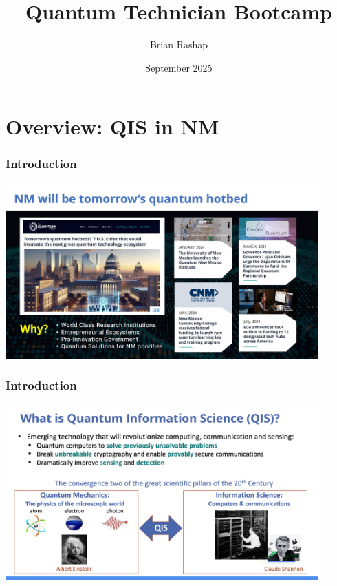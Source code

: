 \documentclass{beamer}
\begin{document}
\title{Quantum Technician Bootcamp}
\author{Brian Rashap}
\date{September 2025} 

\begin{frame}
\titlepage
\end{frame}



\section{Overview: QIS in NM}

\begin{frame}\frametitle{Introduction}
\begin{center}
\includegraphics[width=12cm]{fig/Slide2.jpeg}
\end{center}
\end{frame}

\begin{frame}\frametitle{Introduction}
\begin{center}
\includegraphics[width=12cm]{fig/Slide4.jpeg}
\end{center}
\end{frame}
\end{document}
